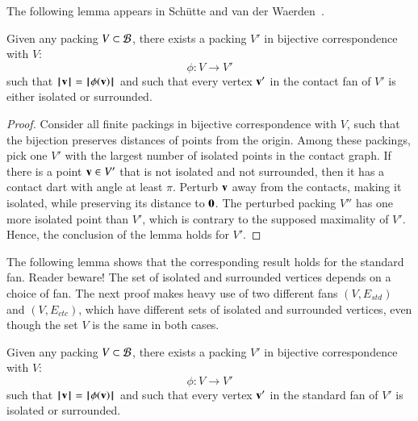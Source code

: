 The following lemma appears in Sch\"utte and van der Waerden~\cite{vanderWaerden:1951}.

\begin{lemma}
Given any packing $V\subset {\mathcal B}$,
there exists a  packing $V'$ 
in bijective correspondence with $V$:
$$
\phi:V\to V'
$$
such that ${{\hskip0.1em|\hskip-0.15em|\hskip0.1em}{\mathbf v}{\hskip0.1em|\hskip-0.15em|\hskip0.1em}} = {{\hskip0.1em|\hskip-0.15em|\hskip0.1em}\phi({\mathbf v}){\hskip0.1em|\hskip-0.15em|\hskip0.1em}}$ and
such that every vertex ${\mathbf v}'$ in the contact fan of $V'$
is either isolated or surrounded.
\end{lemma}
%
%
%

\begin{proof} Consider all finite packings in 
bijective correspondence with $V$, such that the
bijection preserves distances of points from the origin.
Among these packings, pick one $V'$ with the largest number
of isolated points in the contact graph.  If there is a point ${\mathbf v}\in V'$ that
is not isolated and not surrounded, then it has a contact
dart with angle at least $\pi$.   Perturb ${\mathbf v}$ away from the contacts, making it isolated, while preserving its distance to ${\mathbf 0}$.  The perturbed packing $V''$ has one more isolated point than $V'$, which is contrary to the supposed maximality of $V'$.  Hence, the conclusion of the 
lemma holds for $V'$.
\end{proof}

The following lemma shows that the corresponding result
holds for the standard fan.  Reader beware!  The set of isolated and surrounded vertices depends on a 
choice of fan.  The next proof makes heavy use of two different fans $(V,E_{std})$ and $(V,E_{ctc})$,
which have different sets of isolated and surrounded vertices, even though the set $V$ is
the same in both cases.



\begin{lemma}\label{lemma:surrounded}  %
Given any packing $V\subset {\mathcal B}$,
there exists a  packing $V'$ 
in bijective correspondence with $V$:
$$
\phi:V\to V'
$$
such that ${{\hskip0.1em|\hskip-0.15em|\hskip0.1em}{\mathbf v}{\hskip0.1em|\hskip-0.15em|\hskip0.1em}} = {{\hskip0.1em|\hskip-0.15em|\hskip0.1em}\phi({\mathbf v}){\hskip0.1em|\hskip-0.15em|\hskip0.1em}}$ and
such that every vertex ${\mathbf v}'$ in the standard fan of $V'$
is isolated or surrounded.
%
\end{lemma}

